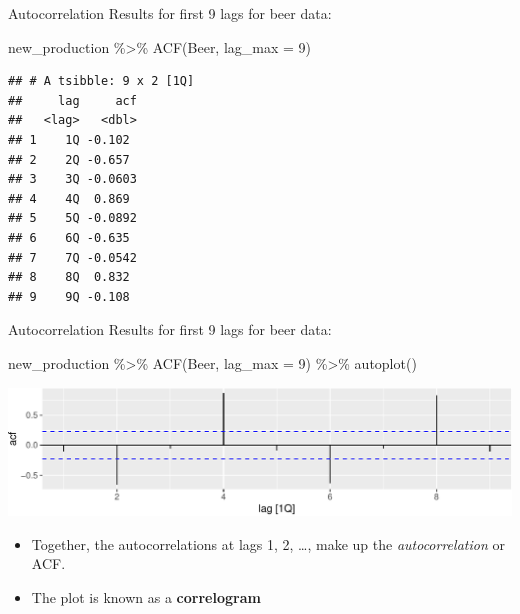 \documentclass[14pt,ignorenonframetext,aspectratio=169]{beamer}
\newenvironment{Shaded}{\begin{snugshade}}{\end{snugshade}}
\newcommand{\AttributeTok}[1]{\textcolor[rgb]{0.77,0.63,0.00}{#1}}
\newcommand{\DecValTok}[1]{\textcolor[rgb]{0.00,0.00,0.81}{#1}}
\newcommand{\FunctionTok}[1]{\textcolor[rgb]{0.00,0.00,0.00}{#1}}
\newcommand{\NormalTok}[1]{#1}
\newcommand{\SpecialCharTok}[1]{\textcolor[rgb]{0.00,0.00,0.00}{#1}}
\providecommand{\tightlist}{%
  \setlength{\itemsep}{0pt}\setlength{\parskip}{0pt}}
\renewenvironment{Shaded}{\color{black}\begin{snugshade}\color{black}}{\end{snugshade}}
\renewenvironment{Shaded}{\color{black}\fontsize{10}{10}\sf\begin{snugshade}\color{black}}{\end{snugshade}}
\begin{document}
\begin{frame}[fragile]{Autocorrelation}
\protect\hypertarget{autocorrelation-2}{}
Results for first 9 lags for beer data:

\fontsize{11}{13}\sf

\begin{Shaded}
\begin{Highlighting}[]
\NormalTok{new\_production }\SpecialCharTok{\%\textgreater{}\%} \FunctionTok{ACF}\NormalTok{(Beer, }\AttributeTok{lag\_max =} \DecValTok{9}\NormalTok{)}
\end{Highlighting}
\end{Shaded}

\begin{verbatim}
## # A tsibble: 9 x 2 [1Q]
##     lag     acf
##   <lag>   <dbl>
## 1    1Q -0.102 
## 2    2Q -0.657 
## 3    3Q -0.0603
## 4    4Q  0.869 
## 5    5Q -0.0892
## 6    6Q -0.635 
## 7    7Q -0.0542
## 8    8Q  0.832 
## 9    9Q -0.108
\end{verbatim}
\end{frame}

\begin{frame}[fragile]{Autocorrelation}
\protect\hypertarget{autocorrelation-3}{}
Results for first 9 lags for beer data:

\fontsize{11}{13}\sf

\begin{Shaded}
\begin{Highlighting}[]
\NormalTok{new\_production }\SpecialCharTok{\%\textgreater{}\%} \FunctionTok{ACF}\NormalTok{(Beer, }\AttributeTok{lag\_max =} \DecValTok{9}\NormalTok{) }\SpecialCharTok{\%\textgreater{}\%} \FunctionTok{autoplot}\NormalTok{()}
\end{Highlighting}
\end{Shaded}

\includegraphics{2-tsgraphics_files/figure-beamer/beeracf-1.pdf}

\begin{itemize}
\tightlist
\item
  Together, the autocorrelations at lags 1, 2, \dots, make up the
  \emph{autocorrelation} or ACF.
\item
  The plot is known as a \textbf{correlogram}
\end{itemize}

\vspace*{10cm}
\end{frame}
\end{document}
